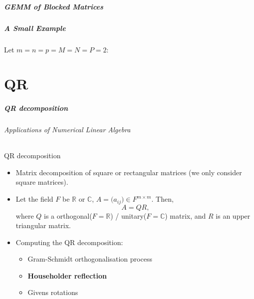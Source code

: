 \begin{frame}
\frametitle{GEMM of Blocked Matrices}
\frametitle{A Small Example}
Let \(m = n = p = M = N = P = 2\):
\vspace{0.3cm}
\begin{center}
\end{center}
\end{frame}

\part{QR}
\makepart

\begin{frame}
\frametitle{QR decomposition}
\framesubtitle{Applications of Numerical Linear Algebra}
QR decomposition
\begin{itemize}
 \item Matrix decomposition of square or rectangular matrices (we only consider square matrices).
 \item Let the field \(F\) be \(\mathbb{R}\) or \(\mathbb{C}\), \(A =\big( a_{ij} \big) \in F^{m \times m}\). Then,
 \begin{equation}
  A = QR,
 \end{equation}
 where \(Q\) is a orthogonal(\(F=\mathbb{R}\)) / unitary(\(F=\mathbb{C}\)) matrix, and \(R\) is an upper triangular matrix.
 \item Computing the QR decomposition:
 \begin{itemize}
  \item Gram-Schmidt orthogonalisation process
  \item \textbf{Householder reflection}
  \item Givens rotations
 \end{itemize}
\end{itemize}
\end{frame}

